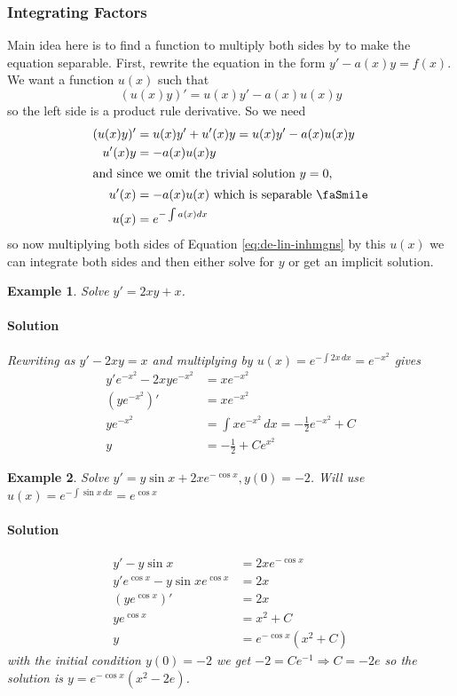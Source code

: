 \documentclass[letterpaper, 11pt, openany]{book}
\theoremstyle{mytheoremstyle}
\theoremstyle{myexamplestyle}
\newtheorem{example}{Example}[section]
\newenvironment{solution}{\paragraph{\sffamily \smaller \fontseries{b}\selectfont Solution}}{\hfill\faSquare}
\begin{document}
\subsubsection{Integrating Factors}
Main idea here is to find a function to multiply both sides by to make the equation separable. First, rewrite the equation in the form \(y' - a(x)y = f(x)\). We want a function \(u(x)\) such that 
\begin{equation}\label{eq:de-lin-inhmgns}
    (u(x) y)' = u(x)y' - a(x)u(x)y
\end{equation}
so the left side is a product rule derivative. So we need
\begin{align*}
    (u(x)y)' &= u(x)y' + u'(x)y = u(x)y' - a(x)u(x)y\\
    u'(x) y &= - a(x)u(x)y\\
    \intertext{and since we omit the trivial solution \(y=0\),}
    u'(x) &= - a(x)u(x) \text{ which is separable \faSmile}\\
    u(x) &= e^{-\int a(x) dx}
\end{align*}
so now multiplying both sides of Equation \eqref{eq:de-lin-inhmgns} by this \(u(x)\) we can integrate both sides and then either solve for \(y\) or get an implicit solution.

\begin{example}\label{e:de-lin-intfact-gen}
    Solve \(y' = 2xy + x\).
    \begin{solution}
        Rewriting as \(y' - 2xy = x\) and multiplying by \(u(x) = e^{-\int 2x\, dx} = e^{-x^{2}}\) gives
        \begin{align*}
            y'e^{-x^{2}} - 2xye^{-x^{2}} &= xe^{-x^{2}}\\
            (ye^{-x^{2}})' &= xe^{-x^{2}}\\
            ye^{-x^{2}} &= \int xe^{-x^{2}} \, dx = -\frac{1}{2} e^{-x^{2}} + C\\
            y &= -\frac{1}{2} + Ce^{x^{2}}
        \end{align*}
    \end{solution}
\end{example}

\begin{example}\label{e:de-lin-intfact-ivp}
    Solve \(y' = y\sin x + 2x e^{-\cos x}, y(0) = -2\).
    Will use \(u(x) = e^{-\int \sin x \, dx} = e^{\cos x}\) \faSmile
    \begin{solution}
        \begin{align*}
            y' - y\sin x &= 2x e^{-\cos x}\\
            y'e^{\cos x} - y\sin x e^{\cos x} &= 2x\\
            (y e^{\cos x})' &= 2x\\
            y e^{\cos x} &= x^{2} + C\\
            y &= e^{-\cos x}(x^{2} + C)
        \end{align*}
        with the initial condition \(y(0) = -2\) we get \(-2 = Ce^{-1} \Rightarrow C = -2e\) so the solution is \(y = e^{-\cos x}(x^{2}-2e)\).
    \end{solution}
\end{example}
\end{document}
